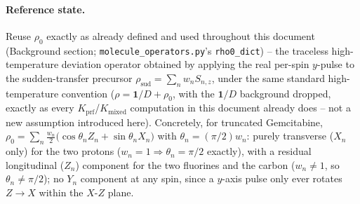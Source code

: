 \documentclass[11pt]{article}
\begin{document}
\paragraph{Reference state.} Reuse $\rho_0$ exactly as already defined and used throughout this document (Background section; \texttt{molecule\_operators.py}'s \texttt{rho0\_dict}) -- the traceless high-temperature deviation operator obtained by applying the real per-spin $y$-pulse to the sudden-transfer precursor $\rho_{\text{sud}}=\sum_nw_nS_{n,z}$, under the same standard high-temperature convention ($\rho=\mathbf1/D+\rho_0$, with the $\mathbf1/D$ background dropped, exactly as every $K_{\text{prf}}$/$K_{\text{mixed}}$ computation in this document already does -- not a new assumption introduced here). Concretely, for truncated Gemcitabine, $\rho_0=\sum_n\tfrac{w_n}2\big(\cos\theta_nZ_n+\sin\theta_nX_n\big)$ with $\theta_n=(\pi/2)w_n$: purely transverse ($X_n$ only) for the two protons ($w_n=1\Rightarrow\theta_n=\pi/2$ exactly), with a residual longitudinal ($Z_n$) component for the two fluorines and the carbon ($w_n\neq1$, so $\theta_n\neq\pi/2$); no $Y_n$ component at any spin, since a $y$-axis pulse only ever rotates $Z\to X$ within the $X$-$Z$ plane.
\end{document}
